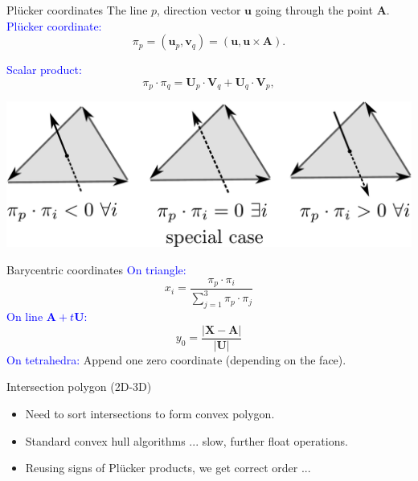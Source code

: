 \documentclass[10pt]{beamer} %
\def\vc#1{\mathbf{\boldsymbol{#1}}}     %
\def\abs#1{\lvert#1\rvert}
\begin{document}
\begin{frame}{Pl\"ucker coordinates}
  The line $p$, direction vector $\vc u$ going through the point $\vc A$.\\
  \textcolor{blue}{Pl\"ucker coordinate:}
  \[
    \pi_p = (\vc u_p, \vc v_q) =( \vc u, \vc u \times \vc A).
  \]
  
  \vspace{2ex}
  \textcolor{blue}{Scalar product:}
  \[
     \pi_p \cdot \pi_q = \vc U_p \cdot \vc V_q + \vc U_q \cdot \vc V_p,
  \] 
  
  \vspace{2ex}
  
  \begin{center}
  \includegraphics[scale=0.2]{graphics/plucker_product.pdf} 
  \end{center}
\end{frame}

\begin{frame}{Barycentric coordinates}
    \textcolor{blue}{On triangle:}
        \[
        x_i = \frac{\pi_p \cdot \pi_i}{\sum_{j=1}^{3} \pi_p \cdot \pi_j}
        \]
    \textcolor{blue}{On line $\vc A + t\vc U$:}
        \[
        y_0 = \frac{\abs{\vc X - \vc A}}{\abs{\vc U}}
        \] 
    \textcolor{blue}{On tetrahedra:}
        Append one zero coordinate (depending on the face).
\end{frame}


\begin{frame}{Intersection polygon (2D-3D)}
\begin{itemize}
 \item Need to sort intersections to form convex polygon.
 \item Standard convex hull algorithms ... slow, further float operations.
 \item Reusing signs of Pl\"ucker products, we get correct order ...
\end{itemize}
\end{frame}
\end{document}
